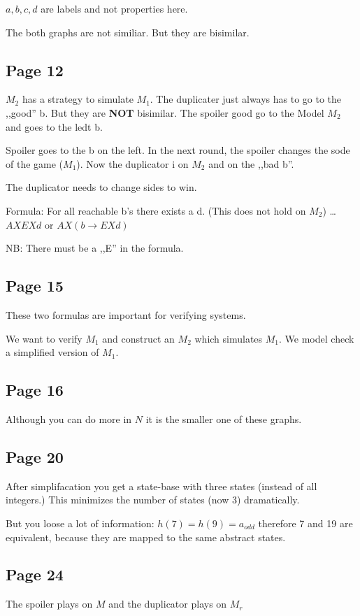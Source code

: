 \documentclass[a4paper]{article}
\begin{document}
$a,b,c,d$ are labels and not properties here.

The both graphs are not similiar. But they are bisimilar.


\subsection{Page 12}
$M_2$ has a strategy to simulate $M_1$. The duplicater
just always has to go to the ,,good'' b. But they are \textbf{NOT} bisimilar.
The spoiler good go to the Model $M_2$ and goes to the ledt b.

Spoiler goes to the b on the left. In the next round, the spoiler changes the
sode of the game ($M_1$). Now the duplicator i on $M_2$ and on the ,,bad b''.

The duplicator needs to change sides to win.

Formula: For all reachable b's there exists a d. (This does not hold on
$M_2$) \ldots $AXEXd$ or $AX(b \rightarrow EXd)$

NB: There must be a ,,E'' in the formula.

\subsection{Page 15}
These two formulas are important for verifying systems.

We want to verify $M_1$ and construct an $M_2$ which simulates $M_1$. We model
check a simplified version of $M_1$.

\subsection{Page 16}
Although you can do more in $N$ it is the smaller one of these graphs.


\subsection{Page 20}
After simplifacation you get a state-base with three states (instead of all
integers.) This minimizes the number of states (now 3) dramatically.

But you loose a lot of information: $h(7) = h(9) = a_{odd}$ therefore 7 and 19
are equivalent, because they are mapped to the same abstract states.

\subsection{Page 24}
The spoiler plays on $M$ and the duplicator plays on $M_r$
\end{document}
